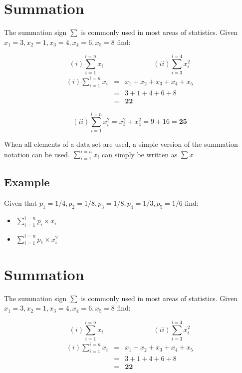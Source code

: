 \documentclass[]{report}
\begin{document}
{\section{Summation}
The summation sign $\sum$ is commonly used in most areas of statistics.
Given $x_1 = 3, x_2= 1, x_3 = 4, x_4 = 6, x_5= 8 $ find:

\[
(i) \displaystyle\sum_{i=1}^{i=n} x_{i}  \hspace{3cm}
(ii) \displaystyle\sum_{i=3}^{i=4} x_{i}^2
\]
\begin{eqnarray*}(i) \displaystyle\sum_{i=1}^{i=n} x_{i} &=& x_1 + x_2 +  x_3 +  x_4 + x_5 \\  &=& 3 +1 +4 +6 + 8 \\ &=& \textbf{22} \end{eqnarray*}

\[ (ii) \displaystyle\sum_{i=1}^{i=n} x_{i}^2 = x_3^2 + x_4^2  = 9 + 16 = \textbf{25} \]

\noindent When all elements of a data set are used, a simple version of the summation notation can be used.
$\displaystyle\sum_{i=1}^{i=n} x_{i}$  can simply be written as $\sum x$


\subsection*{Example}
Given that $p_1= 1/4, p_2= 1/8, p_3= 1/8,p_4= 1/3, p_5 = 1/6$ find:

\begin{itemize}
	\item $\displaystyle\sum_{i=1}^{i=n} p_{i} \times x_{i}$
	\item $\displaystyle\sum_{i=1}^{i=n} p_{1} \times x_{i}^2$
\end{itemize}








\section{Summation}
The summation sign $\sum$ is commonly used in most areas of statistics.
Given $x_1 = 3, x_2= 1, x_3 = 4, x_4 = 6, x_5= 8 $ find:

\[
(i) \displaystyle\sum_{i=1}^{i=n} x_{i}  \hspace{3cm}
(ii) \displaystyle\sum_{i=3}^{i=4} x_{i}^2
\]
\begin{eqnarray*}(i) \displaystyle\sum_{i=1}^{i=n} x_{i} &=& x_1 + x_2 +  x_3 +  x_4 + x_5 \\  &=& 3 +1 +4 +6 + 8 \\ &=& \textbf{22} \end{eqnarray*}

}
\end{document}
